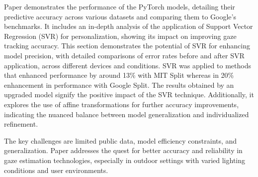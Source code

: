 \documentclass[conference]{IEEEtran}
\begin{document}
Paper\cite{openGaze1} demonstrates the performance of the PyTorch models, detailing their predictive accuracy across various datasets and comparing them to Google's benchmarks. It includes an in-depth analysis of the application of Support Vector Regression (SVR) for personalization, showing its impact on improving gaze tracking accuracy. This section demonstrates the potential of SVR for enhancing model precision, with detailed comparisons of error rates before and after SVR application, across different devices and conditions. SVR was applied to methods that enhanced performance by around 13\% with MIT Split\cite{gazecapture-1}  whereas in 20\% enhancement in performance with Google Split. The results obtained by an upgraded model signify the positive impact of the SVR technique.\cite{openGaze1} Additionally, it explores the use of affine transformations for further accuracy improvements, indicating the nuanced balance between model generalization and individualized refinement.

The key challenges are limited public data, model efficiency constraints, and generalization. Paper\cite{openGaze1}\cite{openGaze2} addresses the quest for better accuracy and reliability in gaze estimation technologies, especially in outdoor settings with varied lighting conditions and user environments.

\vspace{\baselineskip}
\end{document}
